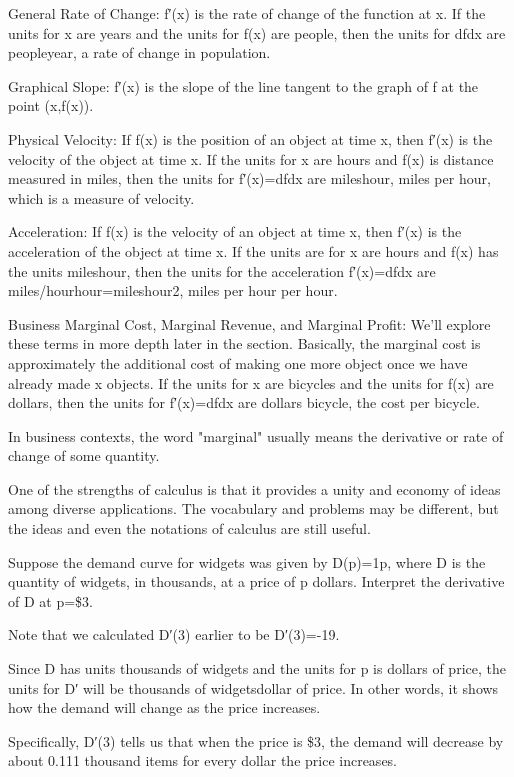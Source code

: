 General
Rate of Change: f′(x) is the rate of change of the function at x. If the units for x are years and the units for f(x) are people, then the units for dfdx are peopleyear, a rate of change in population.

Graphical
Slope: f′(x) is the slope of the line tangent to the graph of f at the point (x,f(x)).

Physical
Velocity: If f(x) is the position of an object at time x, then f′(x) is the velocity of the object at time x. If the units for x are hours and f(x) is distance measured in miles, then the units for f′(x)=dfdx are mileshour, miles per hour, which is a measure of velocity.

Acceleration: If f(x) is the velocity of an object at time x, then f′(x) is the acceleration of the object at time x. If the units are for x are hours and f(x) has the units mileshour, then the units for the acceleration f′(x)=dfdx are miles/hourhour=mileshour2, miles per hour per hour.

Business
Marginal Cost, Marginal Revenue, and Marginal Profit: We'll explore these terms in more depth later in the section. Basically, the marginal cost is approximately the additional cost of making one more object once we have already made x objects. If the units for x are bicycles and the units for f(x) are dollars, then the units for f′(x)=dfdx are dollars bicycle, the cost per bicycle.

In business contexts, the word "marginal" usually means the derivative or rate of change of some quantity.

One of the strengths of calculus is that it provides a unity and economy of ideas among diverse applications. The vocabulary and problems may be different, but the ideas and even the notations of calculus are still useful.

\begin{example}
Suppose the demand curve for widgets was given by D(p)=1p, where D is the quantity of widgets, in thousands, at a price of p dollars. Interpret the derivative of D at p=\$3.

\begin{solution} Note that we calculated D′(3) earlier to be D′(3)=-19.

Since D has units thousands of widgets and the units for p is dollars of price, the units for D′ will be thousands of widgetsdollar of price. In other words, it shows how the demand will change as the price increases.

Specifically, D′(3) tells us that when the price is \$3, the demand will decrease by about 0.111 thousand items for every dollar the price increases.
\end{solution}\end{example} 
